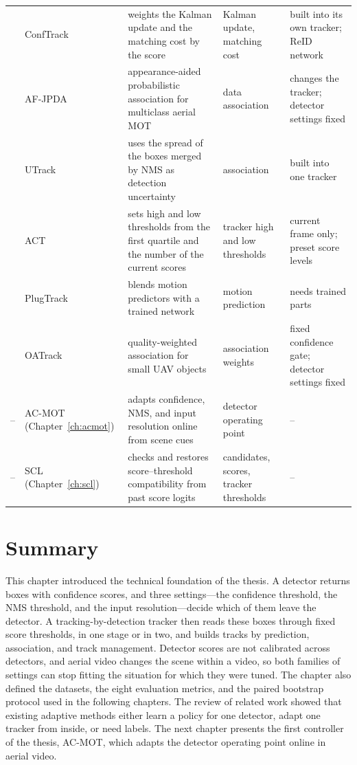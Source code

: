 \begin{table}[tbp]
\begin{tabular}{>{\raggedright\arraybackslash}p{0.8cm}>{\raggedright\arraybackslash}p{2.3cm}>{\raggedright\arraybackslash}p{4.8cm}>{\raggedright\arraybackslash}p{2.5cm}>{\raggedright\arraybackslash}p{3.6cm}}
2024 & ConfTrack \cite{jung2024conftrack} & weights the Kalman update and the matching cost by the score & Kalman update, matching cost & built into its own tracker; ReID network \\
2024 & AF-JPDA \cite{kim2024afjpda} & appearance-aided probabilistic association for multiclass aerial MOT & data association & changes the tracker; detector settings fixed \\
2025 & UTrack \cite{solano2025utrack} & uses the spread of the boxes merged by NMS as detection uncertainty & association & built into one tracker \\
2026 & ACT \cite{act2026adaptive} & sets high and low thresholds from the first quartile and the number of the current scores & tracker high and low thresholds & current frame only; preset score levels \\
2026 & PlugTrack \cite{kim2026plugtrack} & blends motion predictors with a trained network & motion prediction & needs trained parts \\
2026 & OATrack \cite{qi2026oatrack} & quality-weighted association for small UAV objects & association weights & fixed confidence gate; detector settings fixed \\
\midrule
-- & AC-MOT (Chapter~\ref{ch:acmot}) & adapts confidence, NMS, and input resolution online from scene cues & detector operating point & -- \\
-- & SCL (Chapter~\ref{ch:scl}) & checks and restores score--threshold compatibility from past score logits & candidates, scores, tracker thresholds & -- \\
\bottomrule
\end{tabular}
\end{table}

\section{Summary}\label{sec:bg-summary}
This chapter introduced the technical foundation of the thesis. A detector returns boxes with confidence scores, and three settings---the confidence threshold, the NMS threshold, and the input resolution---decide which of them leave the detector. A tracking-by-detection tracker then reads these boxes through fixed score thresholds, in one stage or in two, and builds tracks by prediction, association, and track management. Detector scores are not calibrated across detectors, and aerial video changes the scene within a video, so both families of settings can stop fitting the situation for which they were tuned. The chapter also defined the datasets, the eight evaluation metrics, and the paired bootstrap protocol used in the following chapters. The review of related work showed that existing adaptive methods either learn a policy for one detector, adapt one tracker from inside, or need labels. The next chapter presents the first controller of the thesis, AC-MOT, which adapts the detector operating point online in aerial video.
